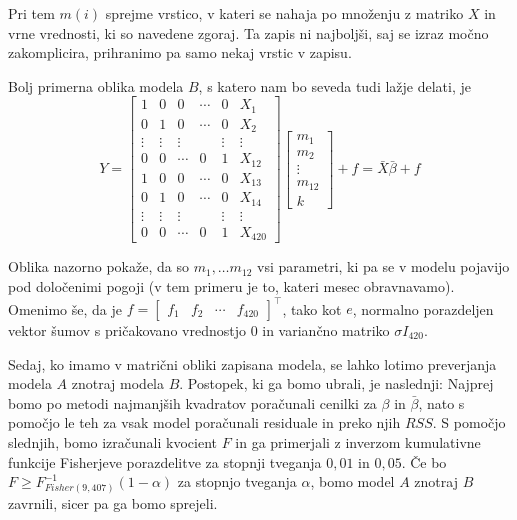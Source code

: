 \documentclass[a4paper, 10pt]{article}
\begin{document}
	Pri tem $m(i)$ sprejme vrstico, v kateri se nahaja po množenju z matriko $X$ in vrne vrednosti, ki so navedene zgoraj. Ta zapis ni najboljši, saj se izraz močno zakomplicira, prihranimo pa samo nekaj vrstic v zapisu.

	Bolj primerna oblika modela $B$, s katero nam bo seveda tudi lažje delati, je $$Y = \begin{bmatrix}
		1 & 0 & 0 & \cdots & 0 & X_1 \\
		0 & 1 & 0 & \cdots & 0 & X_2 \\
		\vdots & \vdots & \vdots & & \vdots & \vdots \\
		0 & 0 & \cdots & 0 & 1 & X_{12} \\
		1 & 0 & 0 & \cdots & 0 & X_{13} \\
		0 & 1 & 0 & \cdots & 0 & X_{14} \\
		\vdots & \vdots & \vdots & & \vdots & \vdots \\
		0 & 0 & \cdots & 0 & 1 & X_{420}
	\end{bmatrix} \begin{bmatrix}
		m_1 \\
		m_2 \\
		\vdots \\
		m_{12} \\
		k
	\end{bmatrix} + f = \bar{X}\bar{\beta} + f$$
	
	Oblika nazorno pokaže, da so $m_1, \ldots m_{12}$ vsi parametri, ki pa se v modelu pojavijo pod določenimi pogoji (v tem primeru je to, kateri mesec obravnavamo). Omenimo še, da je $f =\begin{bmatrix}
		f_1 & f_2 & \cdots & f_{420}
	\end{bmatrix}^{\top}$, tako kot $e$, normalno porazdeljen vektor šumov s pričakovano vrednostjo $0$ in variančno matriko $\sigma I_{420}$.

	Sedaj, ko imamo v matrični obliki zapisana modela, se lahko lotimo preverjanja modela $A$ znotraj modela $B$. Postopek, ki ga bomo ubrali, je naslednji: Najprej bomo po metodi najmanjših kvadratov poračunali cenilki za $\beta$ in $\bar{\beta}$, nato s pomočjo le teh za vsak model poračunali residuale in preko njih $RSS$. S pomočjo slednjih, bomo izračunali kvocient $F$ in ga primerjali z inverzom kumulativne funkcije Fisherjeve porazdelitve za stopnji tveganja $0{,}01$ in $0{,}05$. Če bo $F \geq F^{-1}_{Fisher(9, 407)}(1 - \alpha)$ za stopnjo tveganja $\alpha$, bomo model $A$ znotraj $B$ zavrnili, sicer pa ga bomo sprejeli.
\end{document}
